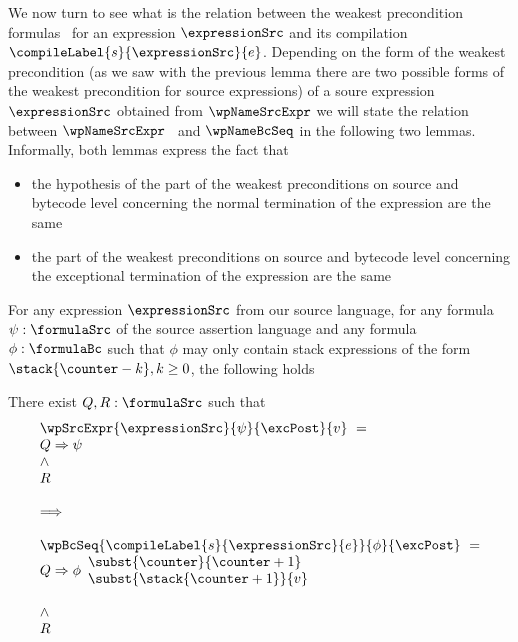 We now turn to see what is the relation between  the weakest precondition formulas \ for  an expression $\expressionSrc$ 
and its compilation $\compileLabel{s}{\expressionSrc}{e}$. 
Depending on the form of the weakest precondition  (as we saw with the previous lemma there are two possible forms of the weakest precondition for source expressions) 
of a soure expression $\expressionSrc $ obtained from  $\wpNameSrcExpr$ 
 we will state the relation between $\wpNameSrcExpr$  \ and $\wpNameBcSeq$  in the following two lemmas.  
Informally, both lemmas express the fact that 
\begin{itemize}
  \item the hypothesis of the part of the weakest preconditions on  source and bytecode level
concerning the normal termination of the expression  are the same  
   \item   the part of the weakest preconditions on  source and bytecode level concerning the exceptional termination 
           of the expression are the same  
\end{itemize}



\begin{exprSrcBcWp1} \label{exprValueOnStack}
 For any expression $\expressionSrc$ from our source language, for any formula $\psi: \formulaSrc$  
of the source assertion language and any formula $\phi: \formulaBc$ such that $\phi$ may only 
contain stack expressions of the form     $\stack{\counter - k}, k \ge 0$, the following holds



  There  exist $ Q, R : \formulaSrc$  such that 
$$ \begin{array}{l}
      \wpSrcExpr{\expressionSrc }{ \psi }{ \excPost}{v} \  = \\ 
          Q \Rightarrow \psi \\
          \wedge \\ 
	  R  \\
  \\
\Longrightarrow \\
 \\

  
	    \wpBcSeq{ \compileLabel{s}{\expressionSrc}{e} }{ \phi }{\excPost} \  = \\ 
              Q \Rightarrow \phi \begin{array}{l}
                                       \subst{\counter}{\counter + 1}\\
			               \subst{\stack{\counter +1}}{ v }
                         \end{array} \\ \\
          \wedge \\ 
	  R 
  \end{array}$$

\end{exprSrcBcWp1}


